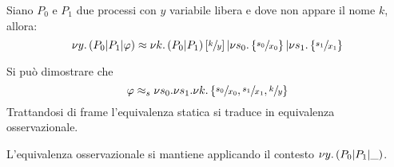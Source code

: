 \begin{frame}
  \begin{mypro}
    Siano $P_0$ e $P_1$ due processi con $y$ variabile libera e dove non
    appare il nome $k$, allora:
    \[ \nu y.\left( P_0 | P_1 | \varphi \right) \approx \nu k.\left( P_0|P_1 \right)
        \left[\sfrac{k}{y}\right] | \nu s_0. \left\{\sfrac{s_0}{x_0}\right\} | \nu
      s_1.\left\{\sfrac{s_1}{x_1}\right\} \]
  \end{mypro}
  
  Si pu\`o dimostrare che
  \[ \varphi \approx _s \nu s_0.\nu s_1.\nu k.\left\{\sfrac{s_0}{x_0},
      \sfrac{s_1}{x_1}, \sfrac{k}{y}\right\} \]
  Trattandosi di frame l'equivalenza statica si traduce in equivalenza
  osservazionale.

  L'equivalenza osservazionale si mantiene applicando il contesto $\nu
  y.\left( P_0 | P_1 | \_ \right)$.
\end{frame}

